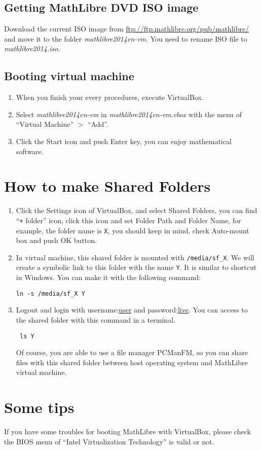 \documentclass[a4]{article}
\newcommand{\vm}{{\em mathlibre2014en-vm}}
\begin{document}
\subsection{Getting MathLibre DVD ISO image}
Download the current ISO image from
\url{ftp://ftp.mathlibre.org/pub/mathlibre/}
and move it to the folder \vm{}. You need to rename ISO file to {\em mathlibre2014.iso}.

\subsection{Booting virtual machine}
\begin{enumerate}
 \item When you finish your every procedures, execute VirtualBox.
 \item Select \vm{} in \vm.{\em vbox} with the menu of ``Virtual Machine'' $>$ ``Add''.
 \item Click the Start icon and push Enter key, you can enjoy mathematical software.
\end{enumerate}

\section{How to make Shared Folders}
\begin{enumerate}
 \item Click the Settings icon of VirtualBox,
       and select Shared Folders, you can find
       ``\verb|+| folder'' icon, click this icon and set Folder Path and
       Folder Name, for example, the folder name is \verb|X|,
       you should keep in mind, check Auto-mount box and push OK button.
 \item  In virtual machine, this shared folder is mounted with
	\verb|/media/sf_X|. We will create a symbolic link to this folder with
	the name \verb|Y|. It is similar to shortcut in Windows. You can make
	it with the following command:
\begin{lstlisting}
ln -s /media/sf_X Y
\end{lstlisting}
\item Logout and login with username:\underline{user} and password:\underline{live}. You can access to the shared folder with this command in a terminal. 
\begin{lstlisting}
 ls Y
\end{lstlisting}
Of course, you are able to use a file manager PCManFM, so you can share
files with this shared folder between host operating system and
      MathLibre virtual machine.
\end{enumerate}

\section{Some tips}
If you have some troubles for booting MathLibre with VirtualBox,
please check the BIOS menu of ``Intel Virtualization Technology'' is
valid or not.
\end{document}
